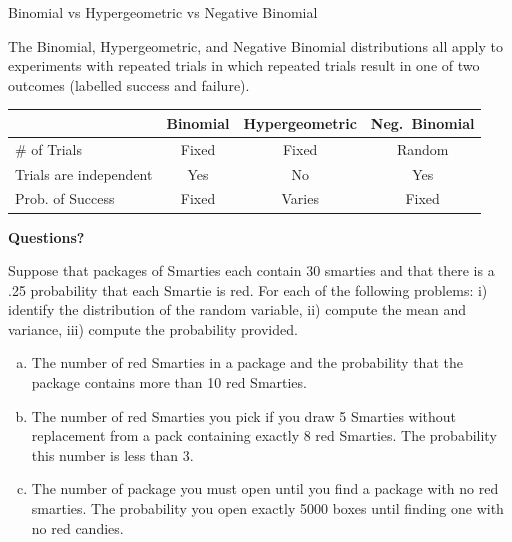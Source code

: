\begin{frame}
\begin{block}{Binomial vs Hypergeometric vs Negative Binomial}

The Binomial, Hypergeometric, and Negative Binomial distributions all apply to experiments with repeated trials in which repeated trials result in one of two outcomes (labelled success and failure). 

\begin{center}
\begin{tabular}{lccc}
& Binomial & Hypergeometric & Neg.~Binomial\\
\hline
\# of Trials & Fixed & Fixed & Random\\
Trials are independent & Yes & No & Yes\\
Prob. of Success & Fixed & Varies & Fixed\\
\end{tabular}
\end{center}

\end{block}
\end{frame}

\begin{frame}

  \begin{center}
    \Large{\textbf{Questions?}}
  \end{center}
\end{frame}

\begin{frame}
  \begin{block}{\exercise}
  Suppose that packages of Smarties each contain 30 smarties and that there is a .25 probability that each Smartie is red. For each of the following problems: i) identify the distribution of the random variable, ii) compute the mean and variance, iii) compute the probability provided.
  
  \begin{enumerate}[a)]
  \item The number of red Smarties in a package and the probability that the package contains more than 10 red Smarties.
  \item The number of red Smarties you pick if you draw 5 Smarties without replacement from a pack containing exactly 8 red Smarties. The probability this number is less than 3.
  \item The number of package you must open until you find a package with no red smarties. The probability you open exactly 5000 boxes until finding one with no red candies. 
  \end{enumerate}
  
  \end{block}
\end{frame}


